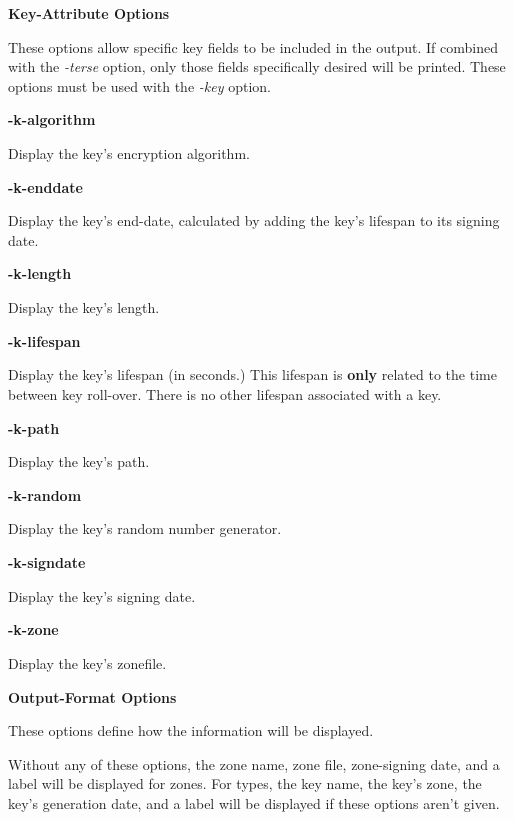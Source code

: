 {\bf Key-Attribute Options}

These options allow specific key fields to be included in the output.  If
combined with the {\it -terse} option, only those fields specifically desired
will be printed.  These options must be used with the {\it -key} option.

\begin{description}

\item {\bf -k-algorithm}\verb" "

Display the key's encryption algorithm.

\item {\bf -k-enddate}\verb" "

Display the key's end-date, calculated by adding the key's lifespan to its
signing date.

\item {\bf -k-length}\verb" "

Display the key's length.

\item {\bf -k-lifespan}\verb" "

Display the key's lifespan (in seconds.) This lifespan is {\bf only} related
to the time between key roll-over.  There is no other lifespan associated with
a key.

\item {\bf -k-path}\verb" "

Display the key's path.

\item {\bf -k-random}\verb" "

Display the key's random number generator.

\item {\bf -k-signdate}\verb" "

Display the key's signing date.

\item {\bf -k-zone}\verb" "

Display the key's zonefile.

\end{description}

{\bf Output-Format Options}

These options define how the  information will be displayed.

Without any of these options, the zone name, zone file, zone-signing date,
and a label will be displayed for zones.  For types, the key name, the key's
zone, the key's generation date, and a label will be displayed if these
options aren't given.

